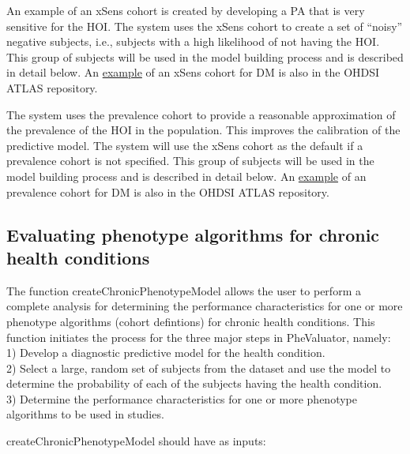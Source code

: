 \documentclass[
]{article}
\begin{document}
An example of an xSens cohort is created by developing a PA that is very
sensitive for the HOI. The system uses the xSens cohort to create a set
of ``noisy'' negative subjects, i.e., subjects with a high likelihood of
not having the HOI. This group of subjects will be used in the model
building process and is described in detail below. An
\href{http://www.ohdsi.org/web/atlas/\#/cohortdefinition/1770120}{example}
of an xSens cohort for DM is also in the OHDSI ATLAS repository.

The system uses the prevalence cohort to provide a reasonable
approximation of the prevalence of the HOI in the population. This
improves the calibration of the predictive model. The system will use
the xSens cohort as the default if a prevalence cohort is not specified.
This group of subjects will be used in the model building process and is
described in detail below. An
\href{http://www.ohdsi.org/web/atlas/\#/cohortdefinition/1770119}{example}
of an prevalence cohort for DM is also in the OHDSI ATLAS repository.

\hypertarget{evaluating-phenotype-algorithms-for-chronic-health-conditions}{%
\subsection{Evaluating phenotype algorithms for chronic health
conditions}\label{evaluating-phenotype-algorithms-for-chronic-health-conditions}}

The function createChronicPhenotypeModel allows the user to perform a
complete analysis for determining the performance characteristics for
one or more phenotype algorithms (cohort defintions) for chronic health
conditions. This function initiates the process for the three major
steps in PheValuator, namely:\\
1) Develop a diagnostic predictive model for the health condition.\\
2) Select a large, random set of subjects from the dataset and use the
model to determine the probability of each of the subjects having the
health condition.\\
3) Determine the performance characteristics for one or more phenotype
algorithms to be used in studies.

createChronicPhenotypeModel should have as inputs:
\end{document}
